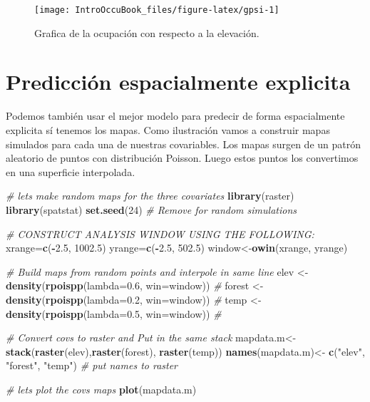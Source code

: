 \documentclass[
]{book}
\newenvironment{Shaded}{\begin{snugshade}}{\end{snugshade}}
\newcommand{\CommentTok}[1]{\textcolor[rgb]{0.56,0.35,0.01}{\textit{#1}}}
\newcommand{\DataTypeTok}[1]{\textcolor[rgb]{0.13,0.29,0.53}{#1}}
\newcommand{\DecValTok}[1]{\textcolor[rgb]{0.00,0.00,0.81}{#1}}
\newcommand{\FloatTok}[1]{\textcolor[rgb]{0.00,0.00,0.81}{#1}}
\newcommand{\KeywordTok}[1]{\textcolor[rgb]{0.13,0.29,0.53}{\textbf{#1}}}
\newcommand{\NormalTok}[1]{#1}
\newcommand{\OperatorTok}[1]{\textcolor[rgb]{0.81,0.36,0.00}{\textbf{#1}}}
\newcommand{\StringTok}[1]{\textcolor[rgb]{0.31,0.60,0.02}{#1}}
\begin{document}
\begin{figure}
\texttt{[image: IntroOccuBook\_files/figure-latex/gpsi-1]} \caption[fig.]{Grafica de la ocupación con respecto a la elevación.}\label{fig:gpsi}
\end{figure}

\hypertarget{predicciuxf3n-espacialmente-explicita}{%
\section{Predicción espacialmente explicita}\label{predicciuxf3n-espacialmente-explicita}}

Podemos también usar el mejor modelo para predecir de forma espacialmente explicita sí tenemos los mapas. Como ilustración vamos a construir mapas simulados para cada una de nuestras covariables. Los mapas surgen de un patrón aleatorio de puntos con distribución Poisson. Luego estos puntos los convertimos en una superficie interpolada.

\begin{Shaded}
\begin{Highlighting}[]
\CommentTok{# lets make random maps for the three covariates}
\KeywordTok{library}\NormalTok{(raster)}
\KeywordTok{library}\NormalTok{(spatstat)}
\KeywordTok{set.seed}\NormalTok{(}\DecValTok{24}\NormalTok{) }\CommentTok{# Remove for random simulations}

\CommentTok{# CONSTRUCT ANALYSIS WINDOW USING THE FOLLOWING:}
\NormalTok{xrange=}\KeywordTok{c}\NormalTok{(}\OperatorTok{-}\FloatTok{2.5}\NormalTok{, }\FloatTok{1002.5}\NormalTok{)}
\NormalTok{yrange=}\KeywordTok{c}\NormalTok{(}\OperatorTok{-}\FloatTok{2.5}\NormalTok{, }\FloatTok{502.5}\NormalTok{)}
\NormalTok{window<-}\KeywordTok{owin}\NormalTok{(xrange, yrange)}

\CommentTok{# Build maps from random points and interpole in same line}
\NormalTok{elev   <-}\StringTok{ }\KeywordTok{density}\NormalTok{(}\KeywordTok{rpoispp}\NormalTok{(}\DataTypeTok{lambda=}\FloatTok{0.6}\NormalTok{, }\DataTypeTok{win=}\NormalTok{window)) }\CommentTok{# }
\NormalTok{forest <-}\StringTok{ }\KeywordTok{density}\NormalTok{(}\KeywordTok{rpoispp}\NormalTok{(}\DataTypeTok{lambda=}\FloatTok{0.2}\NormalTok{, }\DataTypeTok{win=}\NormalTok{window)) }\CommentTok{# }
\NormalTok{temp   <-}\StringTok{ }\KeywordTok{density}\NormalTok{(}\KeywordTok{rpoispp}\NormalTok{(}\DataTypeTok{lambda=}\FloatTok{0.5}\NormalTok{, }\DataTypeTok{win=}\NormalTok{window)) }\CommentTok{# }

\CommentTok{# Convert covs to raster and Put in the same stack }
\NormalTok{mapdata.m<-}\KeywordTok{stack}\NormalTok{(}\KeywordTok{raster}\NormalTok{(elev),}\KeywordTok{raster}\NormalTok{(forest), }\KeywordTok{raster}\NormalTok{(temp)) }
\KeywordTok{names}\NormalTok{(mapdata.m)<-}\StringTok{ }\KeywordTok{c}\NormalTok{(}\StringTok{"elev"}\NormalTok{, }\StringTok{"forest"}\NormalTok{, }\StringTok{"temp"}\NormalTok{) }\CommentTok{# put names to raster}

\CommentTok{# lets plot the covs maps}
\KeywordTok{plot}\NormalTok{(mapdata.m)}
\end{Highlighting}
\end{Shaded}
\end{document}
